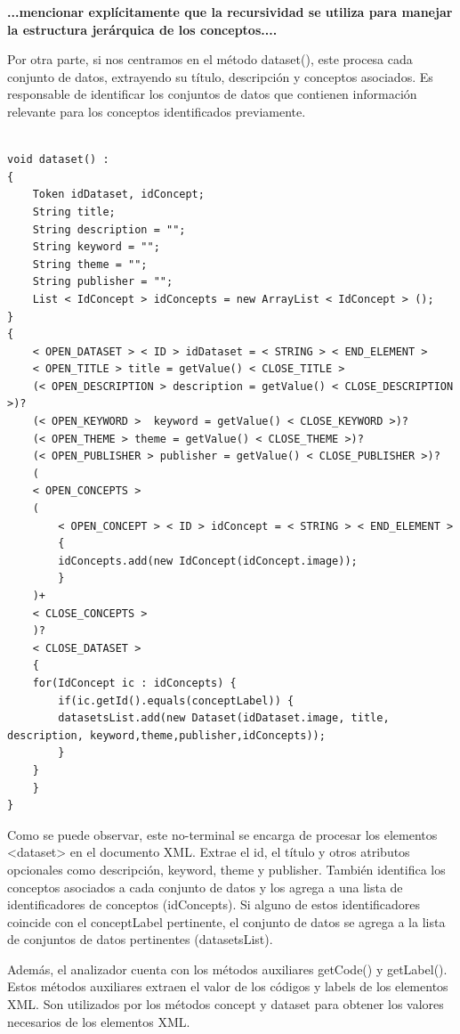 \textbf{...mencionar explícitamente que la recursividad se utiliza para manejar la estructura jerárquica de los conceptos....}

Por otra parte, si nos centramos en el método dataset(), este  procesa cada conjunto de datos, extrayendo su título, descripción y conceptos asociados. Es responsable de identificar los conjuntos de datos que contienen información relevante para los conceptos identificados previamente.

\lstset{inputencoding=utf8/latin1}
\begin{lstlisting}
    
void dataset() :
{
    Token idDataset, idConcept;
    String title;
    String description = "";
    String keyword = "";
    String theme = "";
    String publisher = "";
    List < IdConcept > idConcepts = new ArrayList < IdConcept > ();
} 
{
    < OPEN_DATASET > < ID > idDataset = < STRING > < END_ELEMENT > 
    < OPEN_TITLE > title = getValue() < CLOSE_TITLE > 
    (< OPEN_DESCRIPTION > description = getValue() < CLOSE_DESCRIPTION >)?
    (< OPEN_KEYWORD >  keyword = getValue() < CLOSE_KEYWORD >)?
    (< OPEN_THEME > theme = getValue() < CLOSE_THEME >)?
    (< OPEN_PUBLISHER > publisher = getValue() < CLOSE_PUBLISHER >)?
    (
    < OPEN_CONCEPTS >
    (
        < OPEN_CONCEPT > < ID > idConcept = < STRING > < END_ELEMENT >
        {
        idConcepts.add(new IdConcept(idConcept.image));
        }
    )+
    < CLOSE_CONCEPTS >
    )?
    < CLOSE_DATASET >
    {
    for(IdConcept ic : idConcepts) {
        if(ic.getId().equals(conceptLabel)) {
        datasetsList.add(new Dataset(idDataset.image, title, description, keyword,theme,publisher,idConcepts));
        }
    }
    }
}   

\end{lstlisting}

Como se puede observar, este no-terminal se encarga de procesar los elementos <dataset> en el documento XML. Extrae el id, el título y otros atributos opcionales como descripción, keyword, theme y publisher. También identifica los conceptos asociados a cada conjunto de datos y los agrega a una lista de identificadores de conceptos (idConcepts). Si alguno de estos identificadores coincide con el conceptLabel pertinente, el conjunto de datos se agrega a la lista de conjuntos de datos pertinentes (datasetsList).

Además, el analizador cuenta con los métodos auxiliares getCode()  y getLabel(). Estos métodos auxiliares extraen el valor de los códigos y labels de los elementos XML. Son utilizados por los métodos concept y dataset para obtener los valores necesarios de los elementos XML.

